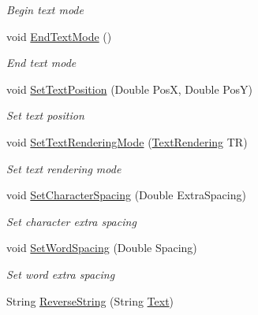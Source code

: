 \begin{DoxyCompactItemize}
\begin{DoxyCompactList}\small\item\em Begin text mode \end{DoxyCompactList}\item 
void \hyperlink{class_pdf_file_writer_1_1_pdf_contents_a2cb48d59acd153b3afd6b0fb68cce476}{End\+Text\+Mode} ()\hypertarget{class_pdf_file_writer_1_1_pdf_contents_a2cb48d59acd153b3afd6b0fb68cce476}{}\label{class_pdf_file_writer_1_1_pdf_contents_a2cb48d59acd153b3afd6b0fb68cce476}

\begin{DoxyCompactList}\small\item\em End text mode \end{DoxyCompactList}\item 
void \hyperlink{class_pdf_file_writer_1_1_pdf_contents_a6af8eac14a7b1aec673d5749c4130fb3}{Set\+Text\+Position} (Double PosX, Double PosY)
\begin{DoxyCompactList}\small\item\em Set text position \end{DoxyCompactList}\item 
void \hyperlink{class_pdf_file_writer_1_1_pdf_contents_affc28e4220c36c78bd123c32ac5d82ac}{Set\+Text\+Rendering\+Mode} (\hyperlink{namespace_pdf_file_writer_ab466009e4cbb95b7157a6548dd75914b}{Text\+Rendering} TR)
\begin{DoxyCompactList}\small\item\em Set text rendering mode \end{DoxyCompactList}\item 
void \hyperlink{class_pdf_file_writer_1_1_pdf_contents_a453da6301edd26380e523de3dbb005da}{Set\+Character\+Spacing} (Double Extra\+Spacing)
\begin{DoxyCompactList}\small\item\em Set character extra spacing \end{DoxyCompactList}\item 
void \hyperlink{class_pdf_file_writer_1_1_pdf_contents_a6adb9725b15771a493172a5bb4514193}{Set\+Word\+Spacing} (Double Spacing)
\begin{DoxyCompactList}\small\item\em Set word extra spacing \end{DoxyCompactList}\item 
String \hyperlink{class_pdf_file_writer_1_1_pdf_contents_a6fa23d37c8109cb8a68d1e0cdca59d42}{Reverse\+String} (String \hyperlink{namespace_pdf_file_writer_a45e52c090a4d8e1333577773ec0bac4aa9dffbf69ffba8bc38bc4e01abf4b1675}{Text})

\end{DoxyCompactItemize}
